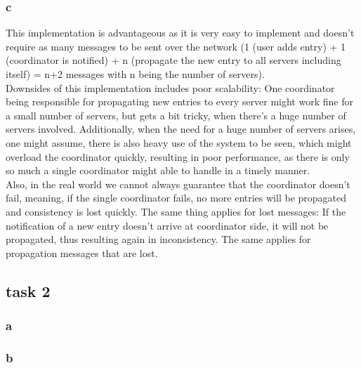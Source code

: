 \documentclass[a4paper, 12pt]{article}
\begin{document}
\subsubsection*{c}
This implementation is advantageous as it is very easy to implement and doesn't require 
as many messages to be sent over the network (1 (user adds entry) + 1 (coordinator is notified) + n (propagate the new entry to all servers including itself) = n+2 messages with n being the number of servers).\\
Downsides of this implementation includes poor scalability: One coordinator being responsible 
for propagating new entries to every server might work fine for a small number of servers, 
but gets a bit tricky, when there's a huge number of servers involved. Additionally, 
when the need for a huge number of servers arises, one might assume, there is also 
heavy use of the system to be seen, which might overload the coordinator quickly, 
resulting in poor performance, as there is only so much a single coordinator might 
able to handle in a timely manner.\\
Also, in the real world we cannot always guarantee that the coordinator doesn't fail, 
meaning, if the single coordinator fails, no more entries will be propagated and 
consistency is lost quickly. The same thing applies for lost messages: If the notification 
of a new entry doesn't arrive at coordinator side, it will not be propagated, thus 
resulting again in inconsistency. The same applies for propagation messages that 
are lost.

\subsection*{task 2}
\subsubsection*{a}

\subsubsection*{b}
\end{document}
